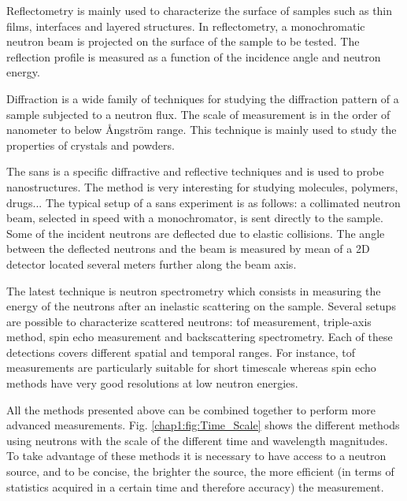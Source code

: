 \begin{refsection}
  Reflectometry is mainly used to characterize the surface of samples such as thin films, interfaces and layered structures. In reflectometry, a monochromatic neutron beam is projected on the surface of the sample to be tested. The reflection profile is measured as a function of the incidence angle and neutron energy.

  Diffraction is a wide family of techniques for studying the diffraction pattern of a sample subjected to a neutron flux. The scale of measurement is in the order of nanometer to below {\AA}ngström range. This technique is mainly used to study the properties of crystals and powders.

  

  The \acrfull{sans} is a specific diffractive and reflective techniques and is used to probe nanostructures. The method is very interesting for studying molecules, polymers, drugs... The typical setup of a \acrshort{sans} experiment is as follows: a collimated neutron beam, selected in speed with a monochromator, is sent directly to the sample. Some of the incident neutrons are deflected due to elastic collisions. The angle between the deflected neutrons and the beam is measured by mean of a 2D detector located several meters further along the beam axis.

  The latest technique is neutron spectrometry which consists in measuring the energy of the neutrons after an inelastic scattering on the sample. Several setups are possible to characterize scattered neutrons: \acrfull{tof} measurement, triple-axis method, spin echo measurement and backscattering spectrometry. Each of these detections covers different spatial and temporal ranges. For instance, \acrshort{tof} measurements are particularly suitable for short timescale whereas spin echo methods have very good resolutions at low neutron energies.

  All the methods presented above can be combined together to perform more advanced measurements. Fig. \ref{chap1:fig:Time_Scale} shows the different methods using neutrons with the scale of the different time and wavelength magnitudes. To take advantage of these methods it is necessary to have access to a neutron source, and to be concise, the brighter the source, the more efficient (in terms of statistics acquired in a certain time and therefore accuracy) the measurement.

  



\end{refsection}
